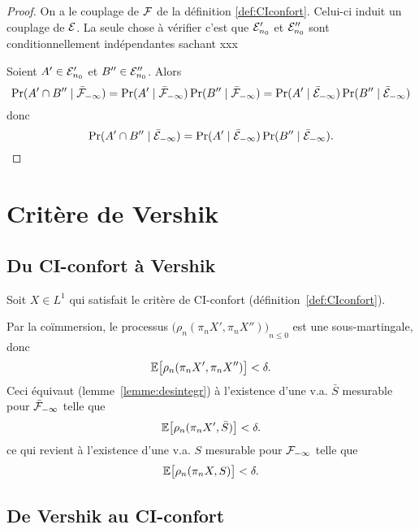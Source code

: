 \documentclass[12pt,a4paper]{article}
\begin{document}
\begin{proof}
On a le couplage de $\mathcal{F}$ de la définition \ref{def:CIconfort}. 
Celui-ci induit un couplage de $\mathcal{E}$. 
La seule chose à vérifier c'est que $\mathcal{E}'_{n_0}$ et $\mathcal{E}''_{n_0}$ sont 
conditionnellement indépendantes sachant xxx

Soient $A' \in \mathcal{E}'_{n_0}$ et $B'' \in \mathcal{E}''_{n_0}$. 
Alors  
$$
\Pr(A' \cap B'' \mid \bar{\mathcal{F}}_{-\infty})
= \Pr(A' \mid \bar{\mathcal{F}}_{-\infty})\Pr(B'' \mid \bar{\mathcal{F}}_{-\infty})
= \Pr(A' \mid \bar{\mathcal{E}}_{-\infty})\Pr(B'' \mid \bar{\mathcal{E}}_{-\infty})
$$
donc
$$
\Pr(A' \cap B'' \mid \bar{\mathcal{E}}_{-\infty})
= \Pr(A' \mid \bar{\mathcal{E}}_{-\infty})\Pr(B'' \mid \bar{\mathcal{E}}_{-\infty}).
$$

\end{proof}


\section{Critère de Vershik}

\subsection{Du CI-confort à Vershik}

Soit $X \in L^1$ qui satisfait le critère de CI-confort (définition~\ref{def:CIconfort}). 

Par la co\"immersion, le processus ${\bigl(\rho_n(\pi_n X', \pi_n X'')\bigr)}_{n \leq 0}$ 
est une sous-martingale, donc 
$$
\mathbb{E}\bigl[ \rho_n(\pi_n X', \pi_n X'') \bigr] < \delta. 
$$
Ceci équivaut (lemme~\ref{lemme:desintegr}) à l'existence d'une v.a. $\bar S$ 
mesurable pour $\bar{\mathcal{F}}_{-\infty}$ telle que  
$$
\mathbb{E}\bigl[ \rho_n(\pi_n X', \bar S) \bigr] < \delta. 
$$
ce qui revient à l'existence d'une v.a. $S$ 
mesurable pour $\mathcal{F}_{-\infty}$ telle que  
$$
\mathbb{E}\bigl[ \rho_n(\pi_n X, S) \bigr] < \delta. 
$$

\subsection{De Vershik au CI-confort}
\end{document}

